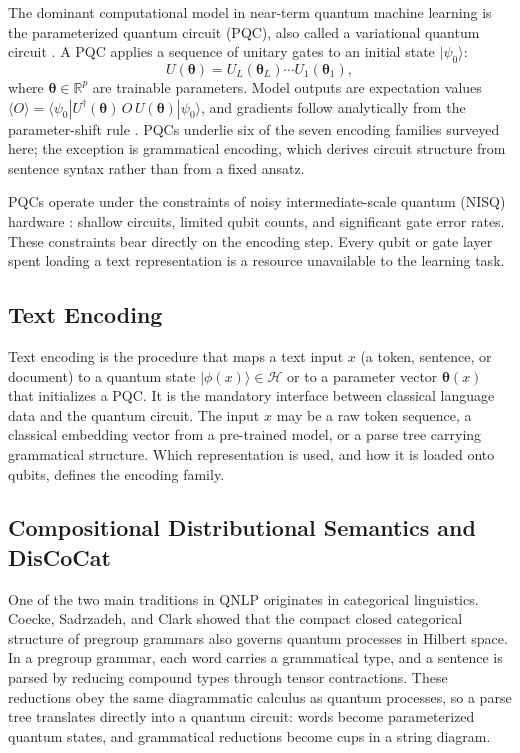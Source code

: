 \documentclass{ieeeaccess}
\begin{document}
The dominant computational model in near-term quantum machine learning is the parameterized quantum circuit (PQC), also called a variational quantum circuit \cite{cerezo2021variational}. A PQC applies a sequence of unitary gates to an initial state $|\psi_0\rangle$:
\begin{equation}
U(\boldsymbol{\theta}) = U_L(\boldsymbol{\theta}_L) \cdots U_1(\boldsymbol{\theta}_1),
\end{equation}
where $\boldsymbol{\theta} \in \mathbb{R}^p$ are trainable parameters. Model outputs are expectation values $\langle O \rangle = \langle \psi_0 | U^\dagger(\boldsymbol{\theta})\, O\, U(\boldsymbol{\theta}) | \psi_0 \rangle$, and gradients follow analytically from the parameter-shift rule \cite{mitarai2018quantum, schuld2019evaluating}. PQCs underlie six of the seven encoding families surveyed here; the exception is grammatical encoding, which derives circuit structure from sentence syntax rather than from a fixed ansatz.

PQCs operate under the constraints of noisy intermediate-scale quantum (NISQ) hardware \cite{preskill2018quantum}: shallow circuits, limited qubit counts, and significant gate error rates. These constraints bear directly on the encoding step. Every qubit or gate layer spent loading a text representation is a resource unavailable to the learning task.

\subsection{Text Encoding}

Text encoding is the procedure that maps a text input $x$ (a token, sentence, or document) to a quantum state $|\phi(x)\rangle \in \mathcal{H}$ or to a parameter vector $\boldsymbol{\theta}(x)$ that initializes a PQC. It is the mandatory interface between classical language data and the quantum circuit. The input $x$ may be a raw token sequence, a classical embedding vector from a pre-trained model, or a parse tree carrying grammatical structure. Which representation is used, and how it is loaded onto qubits, defines the encoding family.

\subsection{Compositional Distributional Semantics and DisCoCat}

One of the two main traditions in QNLP originates in categorical linguistics. Coecke, Sadrzadeh, and Clark \cite{coecke2010mathematical} showed that the compact closed categorical structure of pregroup grammars also governs quantum processes in Hilbert space. In a pregroup grammar, each word carries a grammatical type, and a sentence is parsed by reducing compound types through tensor contractions. These reductions obey the same diagrammatic calculus as quantum processes, so a parse tree translates directly into a quantum circuit: words become parameterized quantum states, and grammatical reductions become cups in a string diagram.
\end{document}
